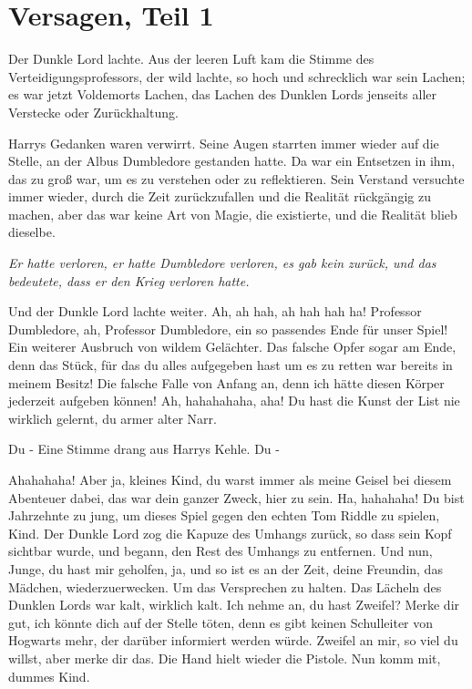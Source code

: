 \chapter{Versagen, Teil 1}

Der Dunkle Lord lachte. Aus der leeren Luft kam die Stimme des
Verteidigungsprofessors, der wild lachte, so hoch und schrecklich war sein
Lachen; es war jetzt Voldemorts Lachen, das Lachen des Dunklen Lords jenseits
aller Verstecke oder Zurückhaltung.

Harrys Gedanken waren verwirrt. Seine Augen starrten immer wieder auf die
Stelle, an der Albus Dumbledore gestanden hatte. Da war ein Entsetzen in ihm,
das zu groß war, um es zu verstehen oder zu reflektieren. Sein Verstand
versuchte immer wieder, durch die Zeit zurückzufallen und die Realität
rückgängig zu machen, aber das war keine Art von Magie, die existierte, und die
Realität blieb dieselbe.

\emph{Er hatte verloren, er hatte Dumbledore verloren, es gab kein zurück, und
das bedeutete, dass er den Krieg verloren hatte.}

Und der Dunkle Lord lachte weiter. \glqq{}Ah, ah hah, ah hah hah ha! Professor
Dumbledore, ah, Professor Dumbledore, ein so passendes Ende für unser Spiel!\grqq{}
Ein weiterer Ausbruch von wildem Gelächter. \glqq{}Das falsche Opfer sogar am
Ende, denn das Stück, für das du alles aufgegeben hast um es zu retten war
bereits in meinem Besitz! Die falsche Falle von Anfang an, denn ich hätte diesen
Körper jederzeit aufgeben können! Ah, hahahahaha, aha! Du hast die Kunst der
List nie wirklich gelernt, du armer alter Narr.\grqq{}

\glqq{}Du -\grqq{} Eine Stimme drang aus Harrys Kehle. \glqq{}Du -\grqq{}

\glqq{}Ahahahaha! Aber ja, kleines Kind, du warst immer als meine Geisel bei
diesem Abenteuer dabei, das war dein ganzer Zweck, hier zu sein. Ha, hahahaha!
Du bist Jahrzehnte zu jung, um dieses Spiel gegen den echten Tom Riddle zu
spielen, Kind.\grqq{} Der Dunkle Lord zog die Kapuze des Umhangs zurück, so dass sein
Kopf sichtbar wurde, und begann, den Rest des Umhangs zu entfernen. \glqq{}Und
nun, Junge, du hast mir geholfen, ja, und so ist es an der Zeit, deine Freundin,
das Mädchen, wiederzuerwecken. Um das Versprechen zu halten.\grqq{} Das Lächeln des
Dunklen Lords war kalt, wirklich kalt. \glqq{}Ich nehme an, du hast Zweifel?
Merke dir gut, ich könnte dich auf der Stelle töten, denn es gibt keinen
Schulleiter von Hogwarts mehr, der darüber informiert werden würde. Zweifel an
mir, so viel du willst, aber merke dir das.\grqq{} Die Hand hielt wieder die Pistole.
\glqq{}Nun komm mit, dummes Kind.\grqq{}

